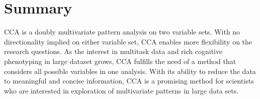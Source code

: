 \section{Summary}
CCA is a doubly multivariate pattern analysis on two variable sets. With no directionality implied on either variable set, CCA enables more flexibility on the research questions. As the interest in multitask data and rich cognitive phenotyping in large dataset grows, CCA fulfills the need of a method that considers all possible variables in one analysis. With its ability to reduce the data to meaningful and concise information, CCA is a promising method for scientists who are interested in exploration of multivariate patterns in large data sets.